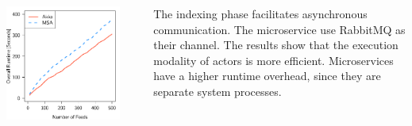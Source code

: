 \documentclass[final,hyperref={pdfpagelabels=true}]{beamer}
\begin{document}
\begin{frame}
\begin{columns}[t]
\begin{column}{.44\textwidth}
      \begin{columns}[t]
        \begin{column}{.4\textwidth}
          \begin{center}
          \includegraphics[width=1\textwidth]{graphics/eval-index-overall.pdf}
          \end{center}
        \end{column}
        \begin{column}{.08\textwidth}
        \end{column}
        \begin{column}{.52\textwidth}
          {\lmodern
            \begin{justify}
            The indexing phase facilitates asynchronous communication. The microservice use RabbitMQ as their channel. The results show that the execution modality of actors is more efficient. Microservices have a higher runtime overhead, since they are separate system processes. 
            \end{justify}
          }
        \end{column}
      \end{columns}

      \vspace*{\baselineskip}


\end{column}
\end{columns}
\end{frame}
\end{document}
